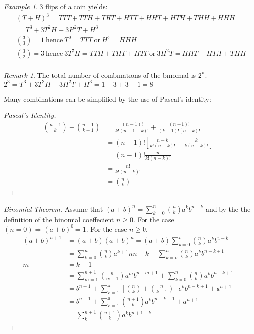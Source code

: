 \documentclass{article}
\theoremstyle{plain}
\theoremstyle{definition}
\theoremstyle{remark}
\newtheorem{remark}{Remark}
\newtheorem{example}{Example}
\begin{document}
\begin{example}
  3 flips of a coin yields:
  \begin{align*}
  &(T + H)^3 = TTT + TTH + THT + HTT + HHT+ HTH + THH + HHH \\
  &= T^3 + 3T^2H + 3H^2T + H^3 \\
  &\binom{3}{3} = 1\ \text{hence}\ T^3 = TTT\ \text{or}\ H^3 = HHH \\
  &\binom{3}{2} = 3\ \text{hence}\ 3T^2H = TTH + THT + HTT\ \text{or}\ 3H^2T = HHT+HTH+THH \\
  \end{align*}
\end{example}
\begin{remark}
  The total number of combinations of the binomial is $2^n$. \\
  $2^3 = T^3 + 3T^2H + 3H^2T + H^3 = 1 + 3 + 3 + 1 = 8$
\end{remark}
Many combinations can be simplified by the use of Pascal's identity:
\begin{proof}[Pascal's Identity]
  \begin{align*}
    \binom{n - 1}{k} + \binom{n - 1}{k - 1} &= \frac{(n-1)!}{k!(n - 1 - k)!} + \frac{(n - 1)!}{(k-1)!(n-k)!} \\
    &= (n - 1)![\frac{n-k}{k!(n-k)!} + \frac{k}{k(n-k)!}] \\
    &= (n - 1)!\frac{n}{k!(n-k)!} \\
    &= \frac{n!}{k!(n - k)!} \\
    &= \binom{n}{k}
  \end{align*}
\end{proof}
\begin{proof}[Binomial Theorem]
  Assume that $(a + b)^n = \sum_{k=0}^{n} \binom{n}{k} a^kb^{n-k}$ and by the the definition of the binomial coeffecient $n \geq 0$. For the case $(n = 0) \Rightarrow (a + b)^0 = 1$. For the case $n \ge 0$.
  \begin{align*}
    (a + b)^{n+1} &= (a + b)(a + b)^n = (a+b)\sum_{k=0}^{n}\binom{n}{k}a^kb^{n-k} \\
                  &= \sum^{n}_{k=0}\binom{n}{k}a^{k+1}n{n-k} + \sum^{n}_{k=o}\binom{n}{k}a^{k}b^{n-k+1} \\
    m &= k + 1 \\
                  &= \sum^{n+1}_{m=1}\binom{n}{m-1}a^{m}b^{n-m+1}+\sum^{n}_{k=0}\binom{n}{k}a^{k}b^{n-k+1} \\
                  &= b^{n+1}+\sum^{n}_{k=1}[\binom{n}{k} + \binom{n}{k-1}]a^kb^{n-k+1}+a^{n+1}\\
                  &= b^{n+1}+\sum^{n}_{k=1}\binom{n+1}{k}a^{k}b^{n-k+1}+a^{n+1} \\
                  &= \sum^{n+1}_{k}\binom{n+1}{k}a^{k}b^{n+1-k}
  \end{align*}
\end{proof}
\end{document}
